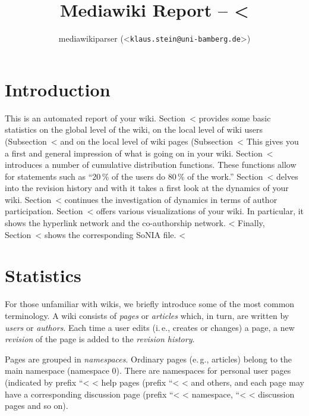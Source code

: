 \documentclass{scrartcl}
\title{Mediawiki Report -- <%
}
\author{mediawikiparser (<\texttt{klaus.stein@uni-bamberg.de}>)}
\begin{document}
\maketitle

\section{Introduction} %
\label{sec:introduction}

This is an automated report of your wiki. 
Section~<%
provides some basic statistics on the global level of the wiki,
on the local level of wiki users (Subsection~<%
and on the local level of wiki pages (Subsection~<%
This gives you a first and general impression of what is 
going on in your wiki. 
Section~<%
introduces a number of cumulative distribution functions. 
These functions allow for statements such as ``20\,\% of 
the users do 80\,\% of the work.'' 
Section~<%
delves into the revision history and with it takes a 
first look at the dynamics of your wiki. 
Section~<%
continues the investigation of dynamics in terms of author participation. 
Section~<%
offers various visualizations of your wiki. In particular, it shows 
the hyperlink network and the co-authorship network.
<%
Finally, Section~<%
shows the corresponding SoNIA file.
<%


\section{Statistics} %
\label{sec:statistics}

For those unfamiliar with wikis, we briefly introduce some of the most common terminology. A wiki consists of \emph{pages} or \emph{articles} which, in turn, are written by \emph{users} or \emph{authors}. Each time a user edits (i.\,e., creates or changes) a page, a new \emph{revision} of the page is added to the \emph{revision history}.

Pages are grouped in \emph{namespaces}. Ordinary pages (e.\,g., articles) belong to the main namespace (namespace 0). There are namespaces for personal user pages (indicated by prefix ``<%
<%
help pages (prefix  ``<%
<%
and others, and each page may have a corresponding discussion page
(prefix ``<%
<%
namespace, ``<%
<%
discussion pages and so on).
\end{document}
